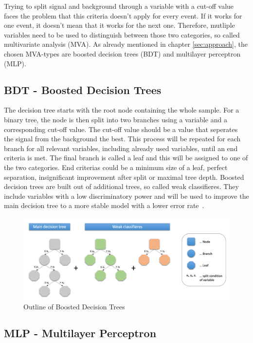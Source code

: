 \documentclass[11pt]{scrartcl}
\begin{document}
Trying to split signal and background through a variable with a cut-off value faces the problem that this criteria doesn't apply for every event. If it works for one event, it doesn't mean that it works for the next one. Therefore, mutliple variables need to be used to distinguish between those two categories, so called multivariate analysis (MVA). As already mentioned in chapter \ref{sec:approach}, the chosen MVA-types are boosted decision trees (BDT) and multilayer perceptron (MLP).

	\subsection{BDT - Boosted Decision Trees}
	The decision tree starts with the root node containing the whole sample. For a binary tree, the node is then split into two branches using a variable and a corresponding cut-off value. The cut-off value should be a value that seperates the signal from the background the best. This process will be repeated for each branch for all relevant variables, including already used variables, until an end criteria is met. The final branch is called a leaf and this will be assigned to one of the two categories. End criterias could be a minimum size of a leaf, perfect separation, insignificant improvement after split or maximal tree depth. Boosted decision trees are built out of additional trees, so called weak classifieres. They include variables with a low discriminatory power and will be used to improve the main decision tree to a more stable model with a lower error rate~\cite{BDT}. 

	\begin{figure}[H]
	\centering
	\includegraphics[width=1\textwidth]{figures/BDT.png}
	\caption{Outline of Boosted Decision Trees}
	\end{figure}
	
	\subsection{MLP - Multilayer Perceptron}
	
\end{document}
